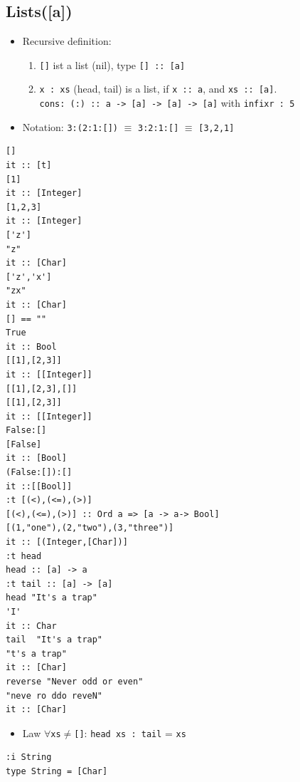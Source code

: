 \documentclass{article}
\newcommand{\Haskell}[1]{\texttt{#1}}
\begin{document}
\subsection{Lists([a])}
\begin{itemize}
\item Recursive definition:
\begin{enumerate}
\item\Haskell{[]} ist a list (nil), type \Haskell{[] :: [a]}
\item\Haskell{x : xs} (head, tail) is a list, if \Haskell{x :: a}, and \Haskell{xs :: [a]}.\\
\phantom{ }\quad \Haskell{cons: (:) :: a -> [a] -> [a] -> [a]} with \Haskell{infixr : 5}
\end{enumerate}
\item Notation: \Haskell{3:(2:1:[])} $\equiv$ \Haskell{3:2:1:[]} $\equiv$ \Haskell{[3,2,1]}
\end{itemize}
\begin{verbatim}
[]
it :: [t]
[1]
it :: [Integer]
[1,2,3]
it :: [Integer]
['z']
"z"
it :: [Char]
['z','x']
"zx"
it :: [Char]
[] == ""
True
it :: Bool
[[1],[2,3]]
it :: [[Integer]]
[[1],[2,3],[]]
[[1],[2,3]]
it :: [[Integer]]
False:[]
[False]
it :: [Bool]
(False:[]):[]
it ::[[Bool]]
:t [(<),(<=),(>)]
[(<),(<=),(>)] :: Ord a => [a -> a-> Bool]
[(1,"one"),(2,"two"),(3,"three")]
it :: [(Integer,[Char])]
:t head
head :: [a] -> a
:t tail :: [a] -> [a]
head "It's a trap"
'I'
it :: Char
tail  "It's a trap"
"t's a trap"
it :: [Char]
reverse "Never odd or even"
"neve ro ddo reveN"
it :: [Char]
\end{verbatim}
\begin{itemize}
\item Law
$\forall $\texttt{xs}$ \ne$\Haskell{[]}: \Haskell{head xs : tail} = \texttt{xs}
\end{itemize}
\begin{verbatim}
:i String
type String = [Char]
\end{verbatim}
\end{document}
